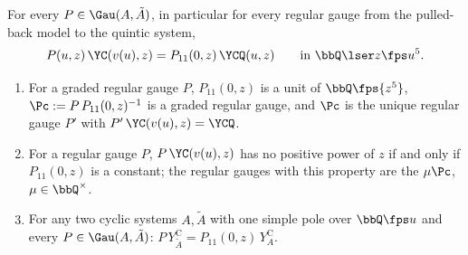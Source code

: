 
\begin{thm}
\label{thm:gau-G}
For every $P\in\Gau(A,\tilde A)$, in particular for every regular gauge from the pulled-back model to the quintic system,
\begin{equation}
\label{eq:gau-G}
P(u,z)\,\YC(v(u),z)=P_{11}(0,z)\,\YCQ(u,z)\qquad\text{in }\bbQ\lser z\fps u^5 .
\end{equation}
\begin{enumerate}
\item[(a)] For a graded regular gauge $P$, $P_{11}(0,z)$ is a unit of $\bbQ\fps{z^5}$, $\Pc:=P\,P_{11}(0,z)^{-1}$ is a graded regular gauge, and $\Pc$ is the unique regular gauge $P'$ with $P'\,\YC(v(u),z)=\YCQ$.
\item[(b)] For a regular gauge $P$, $P\,\YC(v(u),z)$ has no positive power of $z$ if and only if $P_{11}(0,z)$ is a constant; the regular gauges with this property are the $\mu\Pc$, $\mu\in\bbQ^\times$.
\item[(c)] For any two cyclic systems $A,\tilde A$ with one simple pole over $\bbQ\fps u$ and every $P\in\Gau(A,\tilde A)$: $P\,Y^{\mathrm C}_{\tilde A}=P_{11}(0,z)\,Y^{\mathrm C}_A$.
\end{enumerate}
\end{thm}

